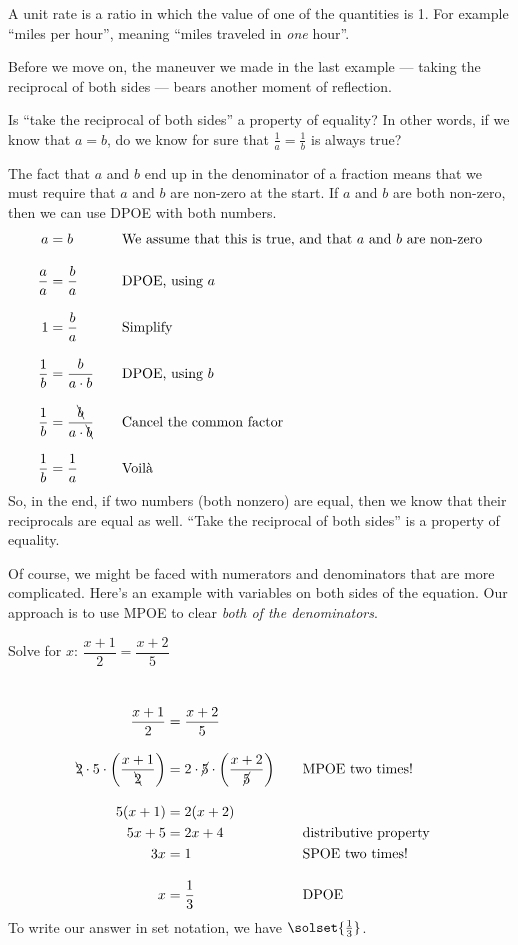 \begin{boxdef}
A \gls{unit rate} is a ratio in which the value of one of the quantities is 1. For example ``miles per hour'', meaning ``miles traveled in \textit{one} hour''.
\end{boxdef}

Before we move on, the maneuver we made in the last example --- taking the reciprocal of both sides --- bears another moment of reflection.

\begin{boxdef}
Is ``take the reciprocal of both sides'' a property of equality? In other words, if we know that $a = b$, do we know for sure that $\frac{1}{a} = \frac{1}{b}$ is always true?

The fact that $a$ and $b$ end up in the denominator of a fraction means that we must require that $a$ and $b$ are non-zero at the start. If $a$ and $b$ are both non-zero, then we can use DPOE with both numbers.
\[\begin{aligned}
a &= b
&&\text{\quad We assume that this is true, and that $a$ and $b$ are non-zero}
\\[2ex]
\frac{a}{a} &= \frac{b}{a}
&&\text{\quad DPOE, using $a$}
\\[2ex]
1 &= \frac{b}{a}
&&\text{\quad Simplify}
\\[2ex]
\frac{1}{b} &= \frac{b}{a\cdot b}
&&\text{\quad DPOE, using $b$}
\\[2ex]
\frac{1}{b} &= \frac{\bcancel{b}}{a\cdot \bcancel{b}}
&&\text{\quad Cancel the common factor}
\\[2ex]
\frac{1}{b} &= \frac{1}{a}
&&\text{\quad Voil\`a}
\end{aligned}\]
So, in the end, if two numbers (both nonzero) are equal, then we know that their reciprocals are equal as well. ``Take the reciprocal of both sides'' is a property of equality.
\end{boxdef}

Of course, we might be faced with numerators and denominators that are more complicated. Here's an example with variables on both sides of the equation. Our approach is to use MPOE to clear \textit{both of the denominators}.

\begin{boxex}
Solve for $x$: $\dfrac{x+1}{2}=\dfrac{x+2}{5}$

\exsoln\
\[\begin{aligned}
\dfrac{x+1}{2} &=\dfrac{x+2}{5}
\\[2ex]
\bcancel{2}\cdot5\cdot\left(\frac{x+1}{\bcancel{2}}\right) &=
2\cdot\cancel{5}\cdot\left(\frac{x+2}{\cancel{5}}\right)
&&\quad\text{MPOE two times!}
\\[2ex]
5(x+1) &= 2(x+2)
\\
5x+5 &= 2x+4
&&\quad\text{distributive property}
\\
3x &= 1
&&\quad\text{SPOE two times!}
\\[2ex]
x &= \dfrac{1}{3}
&&\quad\text{DPOE}
\end{aligned}\]
To write our answer in set notation, we have $\solset{\frac{1}{3}}$.
\end{boxex}


